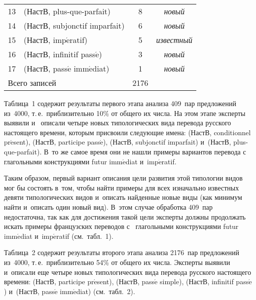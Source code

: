 {\begin{multicols}{2}
\begin{table*}
\begin{center}
\begin{tabular}{|c|l|c|c|}
13\hphantom{9}&(НастВ, plus-que-parfait)&\hphantom{9}8&\textit{новый}\\
14\hphantom{9}&(НастВ, subjonctif imparfait)&\hphantom{9}6&\textit{новый}\\
15\hphantom{9}&(НастВ, imp$\acute{\mbox{e}}$ratif)&\hphantom{9}5&\textit{известный}\\
16\hphantom{9}&(НастВ, infinitif pass$\acute{\mbox{e}}$)&\hphantom{9}3&\textit{новый}\\
17\hphantom{9}&(НастВ, pass$\acute{\mbox{e}}$ imm$\acute{\mbox{e}}$diat)&\hphantom{9}1&\textit{новый}\\
\hline
\multicolumn{2}{|l|}{Всего записей}&2176\hphantom{99}&\\
\hline
\end{tabular}
\end{center}
\end{table*}

      
      Таблица~1 содержит результаты первого этапа анализа 409~пар предложений 
из~4000, т.\,е.\ приблизительно 10\% от общего их числа. На этом этапе эксперты выявили и~
описали четыре новых типологических вида перевода русского настоящего времени, 
которым присвоили следующие имена: (НастВ, conditionnel pr$\acute{\mbox{e}}$sent), 
(НастВ, participe pass$\acute{\mbox{e}}$), (НастВ, subjonctif imparfait) и~(НастВ, 
      plus-que-parfait). В~то же самое время они не нашли примеры вариантов перевода с~
глагольными конструкциями futur imm$\acute{\mbox{e}}$diat и~imp$\acute{\mbox{e}}$ratif.
      
      Таким образом, первый вариант описания цели развития этой типологии видов мог 
бы состоять в~том, чтобы найти примеры для всех изначально известных девяти 
типологических видов и~описать найденные новые виды (как минимум найти и~описать 
один новый вид). В~этом случае обработка 409~пар недостаточна, так как для достижения 
такой цели эксперты должны продолжать искать примеры французских переводов с~
глагольными конструкциями futur imm$\acute{\mbox{e}}$diat и~imp$\acute{\mbox{e}}$ratif 
(см.\ табл.~1).
      
      Таблица~2 содержит результаты второго этапа анализа 2176~пар предложений 
из~4000, т.\,е.\ приблизительно 54\% от общего их числа. Эксперты выявили и~описали еще 
четыре новых типологических вида перевода русского настоящего времени: (НастВ, 
participe pr$\acute{\mbox{e}}$sent), (НастВ, pass$\acute{\mbox{e}}$ simple), (НастВ, infinitif 
pass$\acute{\mbox{e}}$) и~(НастВ, pass$\acute{\mbox{e}}$ imm$\acute{\mbox{e}}$diat) 
(см.\ табл.~2).
      


\end{multicols}}
